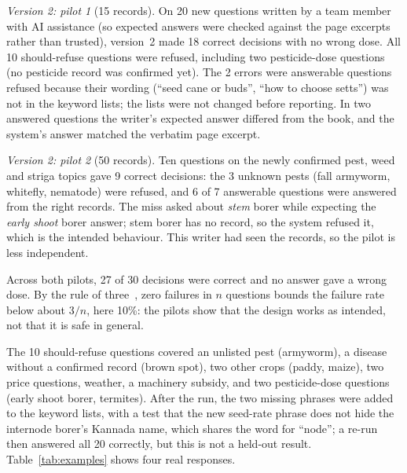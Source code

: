 \documentclass[conference]{IEEEtran}
\begin{document}
\textit{Version 2: pilot 1} (15 records). On 20 new questions written by a team member with
AI assistance (so expected answers were checked against the page excerpts rather than
trusted), version~2 made 18 correct decisions with no wrong dose. All 10 should-refuse
questions were refused, including two pesticide-dose questions (no pesticide record was
confirmed yet). The 2 errors were answerable questions refused because their wording
(``seed cane or buds'', ``how to choose setts'') was not in the keyword lists; the lists
were not changed before reporting. In two answered questions the writer's expected answer
differed from the book, and the system's answer matched the verbatim page excerpt.

\textit{Version 2: pilot 2} (50 records). Ten questions on the newly confirmed pest, weed
and striga topics gave 9 correct decisions: the 3 unknown pests (fall armyworm, whitefly,
nematode) were refused, and 6 of 7 answerable questions were answered from the right records.
The miss asked about \emph{stem} borer while expecting the \emph{early shoot} borer answer;
stem borer has no record, so the system refused it, which is the intended behaviour. This
writer had seen the records, so the pilot is less independent.

Across both pilots, 27 of 30 decisions were correct and no answer gave a wrong dose. By the
rule of three~\cite{hanley1983zero}, zero failures in $n$ questions bounds the failure rate
below about $3/n$, here 10\%: the pilots show that the design works as intended, not that it
is safe in general.

The 10 should-refuse questions covered an unlisted pest (armyworm), a disease without a
confirmed record (brown spot), two other crops (paddy, maize), two price questions,
weather, a machinery subsidy, and two pesticide-dose questions (early shoot borer,
termites). After the run, the two missing phrases were added to the keyword lists, with a
test that the new seed-rate phrase does not hide the internode borer's Kannada name, which
shares the word for ``node''; a re-run then answered all 20 correctly, but this is not a
held-out result. Table~\ref{tab:examples} shows four real responses.
\end{document}
